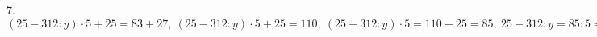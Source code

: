 7. $(25-312:y)\cdot5+25=83+27,\ (25-312:y)\cdot5+25=110,\ (25-312:y)\cdot5=110-25=85,\ 25-312:y=85:5=17,\ 312:y=25-17=8,\ y=312:8=39.$\\

